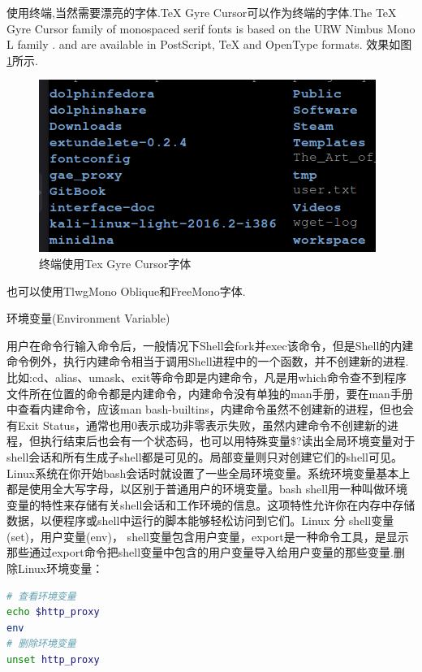 \documentclass[12pt]{book}
\makeatletter
\numberwithin{dummy}{section}
\theoremstyle{ocrenumbox}
\theoremstyle{blacknumex}
\theoremstyle{blacknumbox}
\theoremstyle{ocrenum}
\renewcommand{\subsection}{\@startsection {subsection}{2}{\z@}
	{-3ex \@plus -0.1ex \@minus -.4ex}
	{0.5ex \@plus.2ex }
	{\normalfont\sffamily\bfseries}}
\makeatother
\begin{document}
使用终端,当然需要漂亮的字体.TeX Gyre Cursor可以作为终端的字体.The TeX Gyre Cursor family of monospaced serif fonts is based on the URW Nimbus Mono L family . and are available in PostScript, TeX and OpenType formats. 效果如图\ref{fig:fonttexgyrecursor}所示.

\begin{figure}[htbp]
	\centering
	\includegraphics[scale=0.5]{fonttexgyrecursor.png}
	\caption{终端使用Tex Gyre Cursor字体}
	\label{fig:fonttexgyrecursor}
\end{figure}

也可以使用TlwgMono Oblique和FreeMono字体.

\subsection{环境变量(Environment Variable)}

用户在命令行输入命令后，一般情况下Shell会fork并exec该命令，但是Shell的内建命令例外，执行内建命令相当于调用Shell进程中的一个函数，并不创建新的进程.
比如:cd、alias、umask、exit等命令即是内建命令，凡是用which命令查不到程序文件所在位置的命令都是内建命令，内建命令没有单独的man手册，要在man手册中查看内建命令，应该man bash-builtins，内建命令虽然不创建新的进程，但也会有Exit Status，通常也用0表示成功非零表示失败，虽然内建命令不创建新的进程，但执行结束后也会有一个状态码，也可以用特殊变量\$?读出全局环境变量对于shell会话和所有生成子shell都是可见的。局部变量则只对创建它们的shell可见。Linux系统在你开始bash会话时就设置了一些全局环境变量。系统环境变量基本上都是使用全大写字母，以区别于普通用户的环境变量。bash shell用一种叫做环境变量的特性来存储有关shell会话和工作环境的信息。这项特性允许你在内存中存储数据，以便程序或shell中运行的脚本能够轻松访问到它们。Linux 分 shell变量(set)，用户变量(env)， shell变量包含用户变量，export是一种命令工具，是显示那些通过export命令把shell变量中包含的用户变量导入给用户变量的那些变量.删除Linux环境变量：

\begin{lstlisting}[language=Bash]
# 查看环境变量
echo $http_proxy
env
# 删除环境变量
unset http_proxy
\end{lstlisting}
\end{document}
